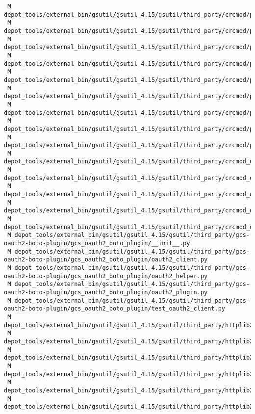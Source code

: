 \documentclass{article}
\begin{document}
\begin{verbatim}
 M depot_tools/external_bin/gsutil/gsutil_4.15/gsutil/third_party/crcmod/python2/crcmod/__init__.py
 M depot_tools/external_bin/gsutil/gsutil_4.15/gsutil/third_party/crcmod/python2/crcmod/_crcfunpy.py
 M depot_tools/external_bin/gsutil/gsutil_4.15/gsutil/third_party/crcmod/python2/crcmod/crcmod.py
 M depot_tools/external_bin/gsutil/gsutil_4.15/gsutil/third_party/crcmod/python2/crcmod/predefined.py
 M depot_tools/external_bin/gsutil/gsutil_4.15/gsutil/third_party/crcmod/python2/crcmod/test.py
 M depot_tools/external_bin/gsutil/gsutil_4.15/gsutil/third_party/crcmod/python3/crcmod/__init__.py
 M depot_tools/external_bin/gsutil/gsutil_4.15/gsutil/third_party/crcmod/python3/crcmod/crcmod.py
 M depot_tools/external_bin/gsutil/gsutil_4.15/gsutil/third_party/crcmod/python3/crcmod/predefined.py
 M depot_tools/external_bin/gsutil/gsutil_4.15/gsutil/third_party/crcmod/python3/crcmod/test.py
 M depot_tools/external_bin/gsutil/gsutil_4.15/gsutil/third_party/crcmod_osx/crcmod/__init__.py
 M depot_tools/external_bin/gsutil/gsutil_4.15/gsutil/third_party/crcmod_osx/crcmod/_crcfunpy.py
 M depot_tools/external_bin/gsutil/gsutil_4.15/gsutil/third_party/crcmod_osx/crcmod/crcmod.py
 M depot_tools/external_bin/gsutil/gsutil_4.15/gsutil/third_party/crcmod_osx/crcmod/predefined.py
 M depot_tools/external_bin/gsutil/gsutil_4.15/gsutil/third_party/crcmod_osx/crcmod/test.py
 M depot_tools/external_bin/gsutil/gsutil_4.15/gsutil/third_party/gcs-oauth2-boto-plugin/gcs_oauth2_boto_plugin/__init__.py
 M depot_tools/external_bin/gsutil/gsutil_4.15/gsutil/third_party/gcs-oauth2-boto-plugin/gcs_oauth2_boto_plugin/oauth2_client.py
 M depot_tools/external_bin/gsutil/gsutil_4.15/gsutil/third_party/gcs-oauth2-boto-plugin/gcs_oauth2_boto_plugin/oauth2_helper.py
 M depot_tools/external_bin/gsutil/gsutil_4.15/gsutil/third_party/gcs-oauth2-boto-plugin/gcs_oauth2_boto_plugin/oauth2_plugin.py
 M depot_tools/external_bin/gsutil/gsutil_4.15/gsutil/third_party/gcs-oauth2-boto-plugin/gcs_oauth2_boto_plugin/test_oauth2_client.py
 M depot_tools/external_bin/gsutil/gsutil_4.15/gsutil/third_party/httplib2/python2/httplib2/__init__.py
 M depot_tools/external_bin/gsutil/gsutil_4.15/gsutil/third_party/httplib2/python2/httplib2/iri2uri.py
 M depot_tools/external_bin/gsutil/gsutil_4.15/gsutil/third_party/httplib2/python2/httplib2/socks.py
 M depot_tools/external_bin/gsutil/gsutil_4.15/gsutil/third_party/httplib2/python2/httplib2/test/functional/test_proxies.py
 M depot_tools/external_bin/gsutil/gsutil_4.15/gsutil/third_party/httplib2/python2/httplib2/test/miniserver.py
 M depot_tools/external_bin/gsutil/gsutil_4.15/gsutil/third_party/httplib2/python2/httplib2test.py

\end{verbatim}
\end{document}
